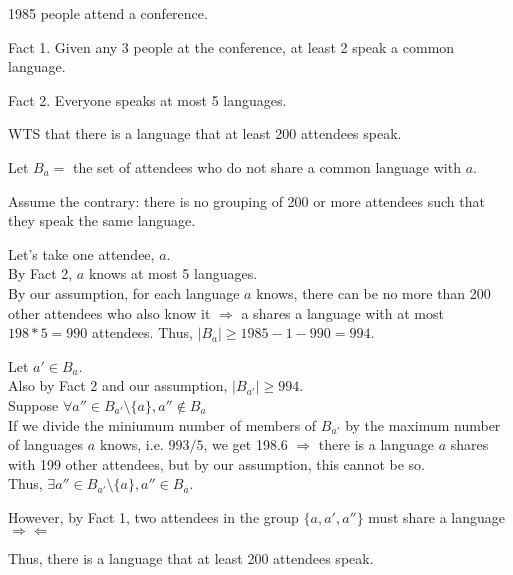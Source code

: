 \documentclass[fleqn]{article}
\begin{document}
1985 people attend a conference.

Fact 1. Given any 3 people at the conference, 
at least 2 speak a common language.

Fact 2. Everyone speaks at most 5 languages.

WTS that there is a language that at least 200 attendees speak.

Let $B_a = $ the set of attendees who do not share a common language with $a$.

Assume the contrary: there is no grouping of 200 or more attendees such that they speak the same language.

Let's take one attendee, $a$.\\
By Fact 2, $a$ knows at most 5 languages.\\
By our assumption, for each language $a$ knows, there can be no more than 200 other attendees who also know it $\Rightarrow$ a shares a language with at most $198*5=990$ attendees. Thus, $|B_a| \geq 1985-1-990=994$.

Let $a' \in B_a$.\\
Also by Fact 2 and our assumption, $|B_{a'}| \geq 994$.\\
Suppose $\forall a'' \in B_{a'}\setminus \lbrace a \rbrace, 
          a'' \not\in B_a$\\
If we divide the miniumum number of members of $B_{a'}$ by the maximum
number of languages $a$ knows, i.e. $993/5$, we get 198.6 $\Rightarrow$ there is a language $a$ shares with 199 other attendees, but by our assumption, this cannot be so.\\
Thus, $\exists a'' \in B_{a'}\setminus \lbrace a \rbrace,
        a'' \in B_a$.

However, by Fact 1, two attendees in the group 
$\lbrace a, a', a'' \rbrace$ must share a language 
$\Rightarrow \Leftarrow$

Thus, there is a language that at least 200 attendees speak.
\end{document}
